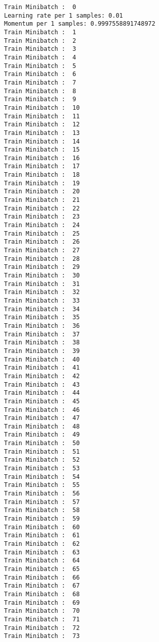\documentclass[11pt]{article}
\begin{document}
\begin{Verbatim}[commandchars=\\\{\}]
Train Minibatch :  0
Learning rate per 1 samples: 0.01
Momentum per 1 samples: 0.9997558891748972
Train Minibatch :  1
Train Minibatch :  2
Train Minibatch :  3
Train Minibatch :  4
Train Minibatch :  5
Train Minibatch :  6
Train Minibatch :  7
Train Minibatch :  8
Train Minibatch :  9
Train Minibatch :  10
Train Minibatch :  11
Train Minibatch :  12
Train Minibatch :  13
Train Minibatch :  14
Train Minibatch :  15
Train Minibatch :  16
Train Minibatch :  17
Train Minibatch :  18
Train Minibatch :  19
Train Minibatch :  20
Train Minibatch :  21
Train Minibatch :  22
Train Minibatch :  23
Train Minibatch :  24
Train Minibatch :  25
Train Minibatch :  26
Train Minibatch :  27
Train Minibatch :  28
Train Minibatch :  29
Train Minibatch :  30
Train Minibatch :  31
Train Minibatch :  32
Train Minibatch :  33
Train Minibatch :  34
Train Minibatch :  35
Train Minibatch :  36
Train Minibatch :  37
Train Minibatch :  38
Train Minibatch :  39
Train Minibatch :  40
Train Minibatch :  41
Train Minibatch :  42
Train Minibatch :  43
Train Minibatch :  44
Train Minibatch :  45
Train Minibatch :  46
Train Minibatch :  47
Train Minibatch :  48
Train Minibatch :  49
Train Minibatch :  50
Train Minibatch :  51
Train Minibatch :  52
Train Minibatch :  53
Train Minibatch :  54
Train Minibatch :  55
Train Minibatch :  56
Train Minibatch :  57
Train Minibatch :  58
Train Minibatch :  59
Train Minibatch :  60
Train Minibatch :  61
Train Minibatch :  62
Train Minibatch :  63
Train Minibatch :  64
Train Minibatch :  65
Train Minibatch :  66
Train Minibatch :  67
Train Minibatch :  68
Train Minibatch :  69
Train Minibatch :  70
Train Minibatch :  71
Train Minibatch :  72
Train Minibatch :  73

    \end{Verbatim}
\end{document}
